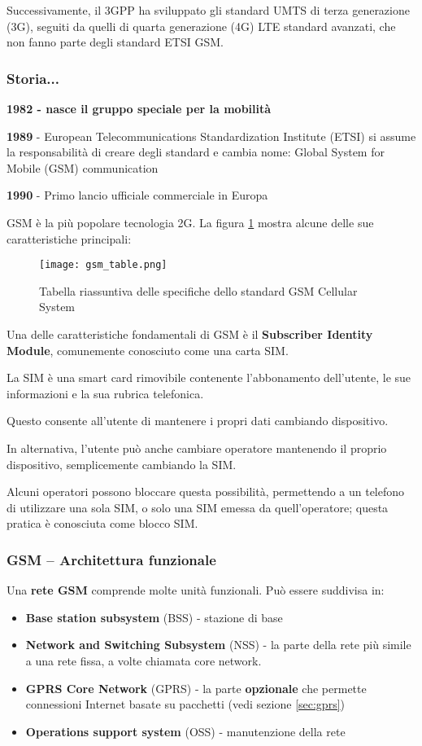 Successivamente, il 3GPP ha sviluppato gli standard UMTS di terza generazione
(3G), seguiti da quelli di quarta generazione (4G) LTE standard avanzati,
che non fanno parte degli standard ETSI GSM.

\subsubsection{Storia...}

\textbf{1982 - nasce il gruppo speciale per la mobilità}

\textbf{1989} - European Telecommunications Standardization Institute
(ETSI) si assume la responsabilità di creare degli standard e cambia nome:
Global System for Mobile (GSM) communication

\textbf{1990} - Primo lancio ufficiale commerciale in Europa

GSM è la più popolare tecnologia 2G. La figura \ref{fig:gsm_table} mostra
alcune delle sue caratteristiche principali:

\begin{figure}[H]
  \centering
  \texttt{[image: gsm\_table.png]}
  \caption{Tabella riassuntiva delle specifiche dello standard GSM Cellular
System}
  \label{fig:gsm_table}
\end{figure}

Una delle caratteristiche fondamentali di GSM è il \textbf{Subscriber Identity
Module}, comunemente conosciuto come una carta SIM.

La SIM è una smart card rimovibile contenente l'abbonamento dell'utente, le
sue informazioni e la sua rubrica telefonica.

Questo consente all'utente di mantenere i propri dati cambiando dispositivo.

In alternativa, l'utente può anche cambiare operatore mantenendo il
proprio dispositivo, semplicemente cambiando la SIM.

Alcuni operatori possono bloccare questa possibilità, permettendo a un
telefono di utilizzare una sola SIM, o solo una SIM emessa da quell'operatore;
questa pratica è conosciuta come blocco SIM.

\subsubsection{GSM – Architettura funzionale}

Una \textbf{rete GSM} comprende molte unità funzionali.
Può essere suddivisa in:

\begin{itemize}
  \item \textbf{Base station subsystem} (BSS) - stazione di base
  \item \textbf{Network and Switching Subsystem} (NSS) - la parte della
rete più simile a una rete fissa, a volte chiamata core network.
  \item \textbf{GPRS Core Network} (GPRS) - la parte \textbf{opzionale} che
permette connessioni Internet basate su pacchetti (vedi sezione \ref{sec:gprs})
  \item \textbf{Operations support system} (OSS) - manutenzione della rete
\end{itemize}

